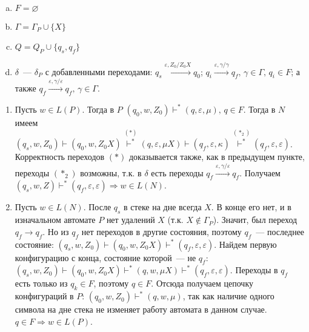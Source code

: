 \documentclass[a4paper]{article}
\begin{document}
\begin{enumerate}
\begin{enumerate}[a.]
\item $F=\varnothing$
\item $\Gamma=\Gamma_P\cup\{X\}$
\item $Q=Q_P\cup\{q_s,q_f\}$
\item $\delta$~--- $\delta_P$ с добавленными переходами: $q_s\overset{\varepsilon,Z_0/Z_0X}{\longrightarrow}q_0$; $q_i\overset{\varepsilon,\gamma/\gamma}{\longrightarrow}q_f,\,\gamma\in\Gamma,\,q_i\in F$; а также $q_f\overset{\varepsilon,\gamma/\varepsilon}{\longrightarrow}q_f,\,\gamma\in \Gamma$.
\end{enumerate}
\begin{enumerate}
\item Пусть $w\in L(P)$. Тогда в $P$ $(q_0,w,Z_0)\vdash^*(q,\varepsilon,\mu),\,q\in F$. Тогда в $N$ имеем $(q_s,w,Z_0)\vdash(q_0,w,Z_0X)\overset{(*)}{\vdash^*}(q,\varepsilon,\mu X)\vdash(q_f,\varepsilon,\kappa)\overset{(*_2)}{\vdash^*}(q_f,\varepsilon,\varepsilon)$. Корректность переходов $(*)$ доказывается также, как в предыдущем пункте, переходы $(*_2)$ возможны, т.к. в $\delta$ есть переходы $q_f\overset{\varepsilon,\gamma/\varepsilon}{\longrightarrow}q_f$. Получаем $(q_s,w,Z)\vdash^*(q_f,\varepsilon,\varepsilon)\Rightarrow w\in L(N)$.
\item Пусть $w\in L(N)$. После $q_s$ в стеке на дне всегда $X$. В конце его нет, и в изначальном автомате $P$ нет удалений $X$ (т.к. $X\notin \Gamma_P$). Значит, был переход $q_f\longrightarrow q_f$. Но из $q_f$ нет переходов в другие состояния, поэтому $q_f$~--- последнее состояние: $(q_s,w,Z_0)\vdash(q_0,w,Z_0X)\vdash^*(q_f,\varepsilon,\varepsilon)$. Найдем первую конфигурацию с конца, состояние которой~--- не $q_f$: $(q_s,w,Z_0)\vdash(q_0,w,Z_0X)\vdash^*(q,w,\mu X)\vdash^*(q_f,\varepsilon,\varepsilon)$. Переходы в $q_f$ есть только из $q_k\in F$, поэтому $q\in F$. Отсюда получаем цепочку конфигураций в $P$: $(q_0,w,Z_0)\vdash^*(q,w,\mu)$, так как наличие одного символа на дне стека не изменяет работу автомата в данном случае. $q\in F\Rightarrow w\in L(P)$.
\end{enumerate}
\end{enumerate}
\end{document}
